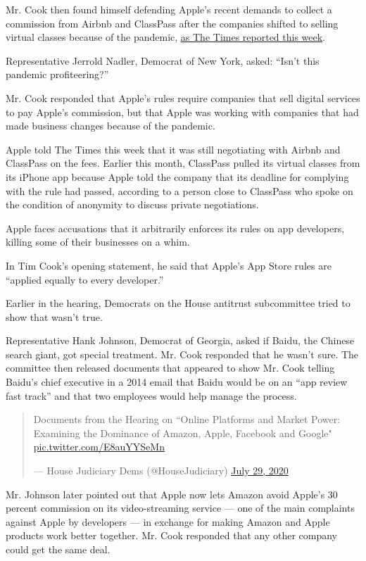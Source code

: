 Mr. Cook then found himself defending Apple's recent demands to collect
a commission from Airbnb and ClassPass after the companies shifted to
selling virtual classes because of the pandemic,
\href{https://www.nytimes3xbfgragh.onion/2020/07/28/technology/apple-app-store-airbnb-classpass.html}{as
The Times reported this week}.

Representative Jerrold Nadler, Democrat of New York, asked: ``Isn't this
pandemic profiteering?''

Mr. Cook responded that Apple's rules require companies that sell
digital services to pay Apple's commission, but that Apple was working
with companies that had made business changes because of the pandemic.

Apple told The Times this week that it was still negotiating with Airbnb
and ClassPass on the fees. Earlier this month, ClassPass pulled its
virtual classes from its iPhone app because Apple told the company that
its deadline for complying with the rule had passed, according to a
person close to ClassPass who spoke on the condition of anonymity to
discuss private negotiations.

Apple faces accusations that it arbitrarily enforces its rules on app
developers, killing some of their businesses on a whim.

In Tim Cook's opening statement, he said that Apple's App Store rules
are ``applied equally to every developer.''

Earlier in the hearing, Democrats on the House antitrust subcommittee
tried to show that wasn't true.

Representative Hank Johnson, Democrat of Georgia, asked if Baidu, the
Chinese search giant, got special treatment. Mr. Cook responded that he
wasn't sure. The committee then released documents that appeared to show
Mr. Cook telling Baidu's chief executive in a 2014 email that Baidu
would be on an ``app review fast track'' and that two employees would
help manage the process.

\begin{quote}
Documents from the Hearing on ``Online Platforms and Market Power:
Examining the Dominance of Amazon, Apple, Facebook and Google"
\href{https://t.co/E8auYYSeMn}{pic.twitter.com/E8auYYSeMn}

--- House Judiciary Dems (@HouseJudiciary)
\href{https://twitter.com/HouseJudiciary/status/1288543144158597124?ref_src=twsrc\%5Etfw}{July
29, 2020}
\end{quote}

Mr. Johnson later pointed out that Apple now lets Amazon avoid Apple's
30 percent commission on its video-streaming service --- one of the main
complaints against Apple by developers --- in exchange for making Amazon
and Apple products work better together. Mr. Cook responded that any
other company could get the same deal.

